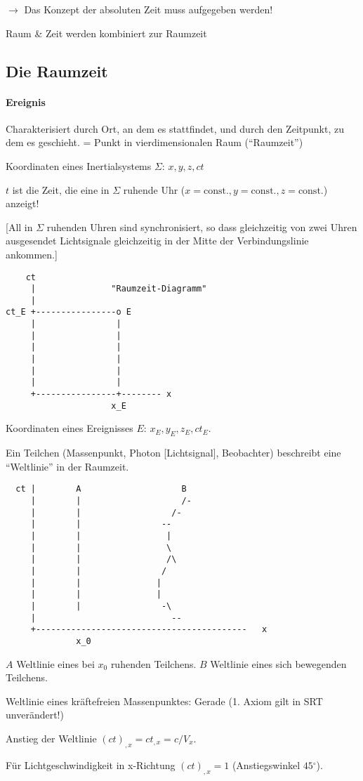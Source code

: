 \documentclass{scrartcl}
\begin{document}
$\rightarrow$ Das Konzept der absoluten Zeit muss aufgegeben werden!

Raum \& Zeit werden kombiniert zur Raumzeit

\subsection{Die Raumzeit}

\paragraph{Ereignis} Charakterisiert durch Ort, an dem es stattfindet,
und durch den Zeitpunkt, zu dem es geschieht. = Punkt in
vierdimensionalen Raum (``Raumzeit'')

Koordinaten eines Inertialsystems $\Sigma$: $x,y,z,ct$

$t$ ist die Zeit, die eine in $\Sigma$ ruhende Uhr
($x=\textrm{const.},y=\textrm{const.},z=\textrm{const.}$) anzeigt!

[All in $\Sigma$ ruhenden Uhren sind synchronisiert, so dass
gleichzeitig von zwei Uhren ausgesendet Lichtsignale gleichzeitig in
der Mitte der Verbindungslinie ankommen.]

\begin{verbatim}
    ct
     |               "Raumzeit-Diagramm"
     |
ct_E +----------------o E
     |                |
     |                |
     |                |
     |                |
     |                |
     |                |
     +----------------+-------- x
                     x_E
\end{verbatim}


Koordinaten eines Ereignisses $E$: $x_E,y_E,z_E,ct_E$.

Ein Teilchen (Massenpunkt, Photon [Lichtsignal], Beobachter)
beschreibt eine ``Weltlinie'' in der Raumzeit.



\begin{verbatim}
  ct |        A                    B
     |        |                    /-
     |        |                  /-
     |        |                --
     |        |                 |
     |        |                 \
     |        |                 /\
     |        |                /
     |        |               |
     |        |               |
     |        |                -\
     |                           --
     +------------------------------------------   x
              x_0
\end{verbatim}

$A$ Weltlinie eines bei $x_0$ ruhenden Teilchens. $B$ Weltlinie eines
sich bewegenden Teilchens.

Weltlinie eines kr\"aftefreien Massenpunktes: Gerade (1. Axiom gilt in
SRT unver\"andert!)

Anstieg der Weltlinie $(ct)_{,x}=c t_{,x} = c/V_x$.

F\"ur Lichtgeschwindigkeit in x-Richtung $(ct)_{,x}=1$ (Anstiegswinkel
$45{}^\circ$).
\end{document}
